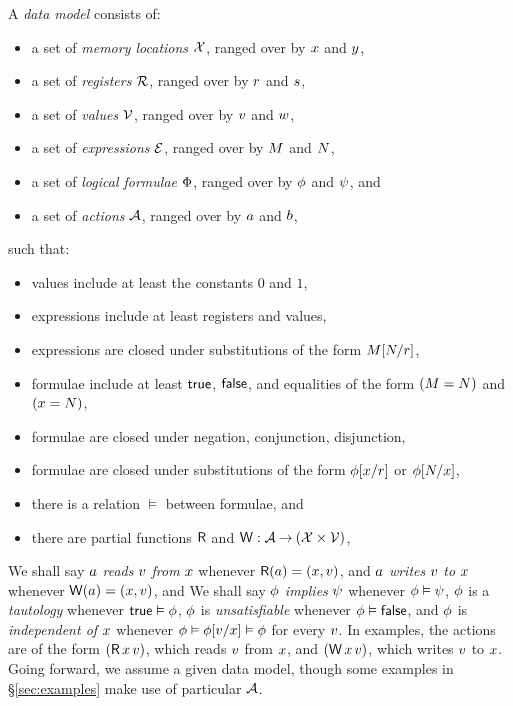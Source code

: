 A \emph{data model} consists of:
\begin{itemize}
\item a set of \emph{memory locations} $\mathcal{X}$, ranged over by
  $x$ and $y$,
\item a set of \emph{registers} $\mathcal{R}$, ranged over by
  $r$ and $s$,
\item a set of \emph{values} $\mathcal{V}$, ranged over by
  $v$ and $w$,
\item a set of \emph{expressions} $\mathcal{E}$, ranged over by
  $M$ and $N$,
\item a set of \emph{logical formulae} $\Phi$, ranged over by
  $\phi$ and $\psi$, and
\item a set of \emph{actions} $\mathcal{A}$, ranged over by $a$ and $b$,
\end{itemize}
such that:
\begin{itemize}
\item values include at least the constants $0$ and $1$,
\item expressions include at least registers and values,
\item expressions are closed under substitutions of the form $M[N/r]$,
\item formulae include at least $\mathsf{true}$, $\mathsf{false}$, and equalities of the form $(M=N)$ and $(x=N)$,
\item formulae are closed under negation, conjunction, disjunction,
\item formulae are closed under substitutions of the form $\phi[x/r]$ or $\phi[N/x]$,
\item there is a relation $\vDash$ between formulae, and
\item there are partial functions $\mathsf{R}$ and $\mathsf{W}: \mathcal{A} \mathbin\rightarrow (\mathcal{X} \times \mathcal{V})$,
\end{itemize}
We shall say $a$ \emph{reads} $v$ \emph{from} $x$ whenever
$\mathsf{R}(a) = (x,v)$, and
$a$ \emph{writes} $v$ \emph{to} $x$ whenever
$\mathsf{W}(a) = (x,v)$, and
We shall say $\phi$ \emph{implies} $\psi$ whenever $\phi\vDash\psi$,
$\phi$ is a \emph{tautology} whenever $\mathsf{true}\vDash\phi$,
$\phi$ is \emph{unsatisfiable} whenever $\phi\vDash\mathsf{false}$, and
$\phi$ is \emph{independent of $x$} whenever $\phi \vDash \phi[v/x] \vDash \phi$ for every $v$.
In examples, the actions are of the form $(\DR{\aLoc}{\aVal})$, which reads $v$ from $x$,
and $(\DW{\aLoc}{\aVal})$, which writes $v$ to $x$.
Going forward, we assume a given data model, though some examples in
\S\ref{sec:examples} make use of particular $\mathcal{A}$.

